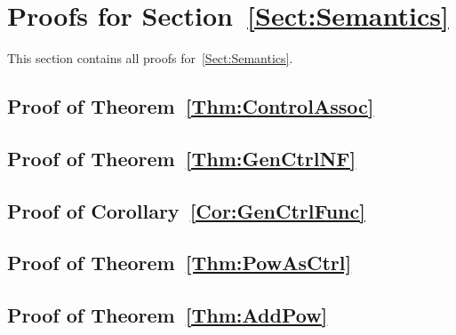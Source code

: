 \section{Proofs for Section~\ref{Sect:Semantics}}
%

This section contains all proofs for~\cref{Sect:Semantics}.

\subsection{Proof of Theorem~\ref{Thm:ControlAssoc}}
%


\subsection{Proof of Theorem~\ref{Thm:GenCtrlNF}}
%


\subsection{Proof of Corollary~\ref{Cor:GenCtrlFunc}}
%


\subsection{Proof of Theorem~\ref{Thm:PowAsCtrl}}
%


\subsection{Proof of Theorem~\ref{Thm:AddPow}}
%

